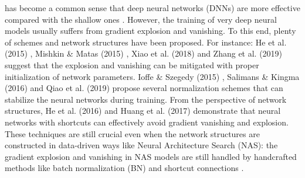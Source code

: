 \documentclass[10pt,journal,compsoc]{IEEEtran}
\begin{document}
\IEEEdisplaynontitleabstractindextext

\IEEEpeerreviewmaketitle



 has become a common sense that deep neural networks (DNNs) are more effective compared with the shallow ones \cite{delalleau2011shallow}. However, the training of very deep neural models usually suffers from gradient explosion and vanishing. To this end, plenty of schemes and network structures have been proposed. For instance: He et al. (2015) \cite{he2015delving}, Mishkin \& Matas (2015) \cite{mishkin2015all}, Xiao et al. (2018) \cite{xiao2018dynamical} and Zhang et al. (2019) \cite{zhang2019fixup} suggest that the explosion and vanishing can be mitigated with proper initialization of network parameters. Ioffe \& Szegedy (2015) \cite{ioffe2015batch}, Salimans \& Kingma (2016) \cite{salimans2016weight} and Qiao et al. (2019) \cite{qiao2019weight} propose several normalization schemes that can stabilize the neural networks during training. From the perspective of network structures, He et al. (2016) \cite{he2016deep} and Huang et al. (2017) \cite{huang2017densely} demonstrate that neural networks with shortcuts can effectively avoid gradient vanishing and explosion. These techniques are still crucial even when the network structures are constructed in data-driven ways like Neural Architecture Search (NAS): the gradient explosion and vanishing in NAS models are still handled by handcrafted methods like batch normalization (BN) and shortcut connections \cite{tan2019mnasnet}.
\end{document}
